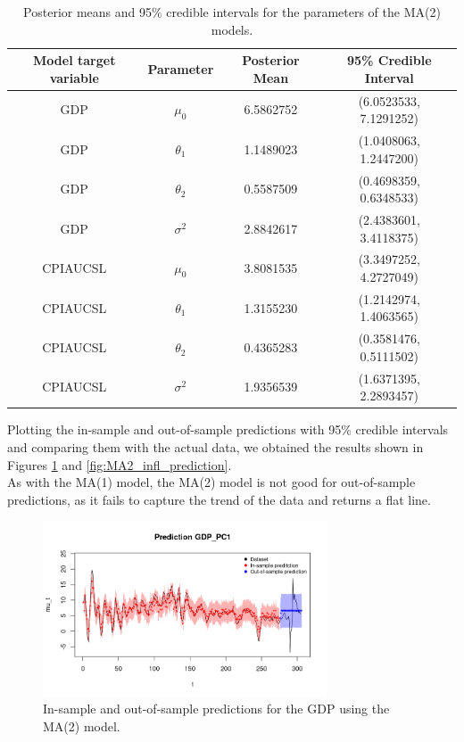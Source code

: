 \begin{table}[H]
    \centering
    \begin{tabular}{|c|c|c|c|}
        \hline
        \textbf{Model target variable } & \textbf{Parameter } & \textbf{Posterior Mean } & \textbf{95\% Credible Interval } \\
        \hline
        GDP      & $\mu_0$    & 6.5862752 & (6.0523533, 7.1291252) \\
        GDP      & $\theta_1$ & 1.1489023 & (1.0408063, 1.2447200) \\
        GDP      & $\theta_2$ & 0.5587509 & (0.4698359, 0.6348533) \\
        GDP      & $\sigma^2$ & 2.8842617 & (2.4383601, 3.4118375) \\
        CPIAUCSL & $\mu_0$    & 3.8081535 & (3.3497252, 4.2727049) \\
        CPIAUCSL & $\theta_1$ & 1.3155230 & (1.2142974, 1.4063565) \\
        CPIAUCSL & $\theta_2$ & 0.4365283 & (0.3581476, 0.5111502) \\
        CPIAUCSL & $\sigma^2$ & 1.9356539 & (1.6371395, 2.2893457) \\
        \hline
    \end{tabular}
    \caption{Posterior means and 95\% credible intervals for the parameters of the MA(2) models.}
    \label{tab:MA2_posteriors}
\end{table}
Plotting the in-sample and out-of-sample predictions with 95\% credible intervals and comparing them with the actual data, we obtained the results shown in Figures \ref{fig:MA2_gdp_prediction} and \ref{fig:MA2_infl_prediction}. \\
As with the MA(1) model, the MA(2) model is not good for out-of-sample predictions, as it fails to capture the trend of the data and returns a flat line.
\begin{figure}[H]
    \centering
    \includegraphics[width=0.75\textwidth]{images/3-MA/gdp_prediction2.png}
    \caption{In-sample and out-of-sample predictions for the GDP using the MA(2) model.}
    \label{fig:MA2_gdp_prediction}
\end{figure}

